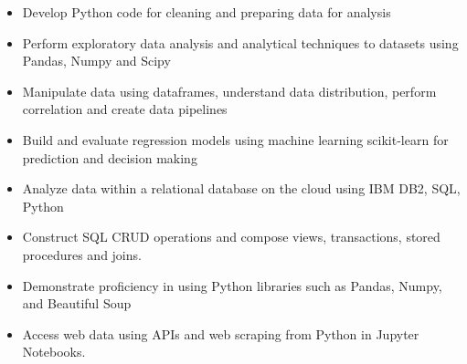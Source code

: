 \documentclass[11pt,a4paper,ragged2e]{altacv}
\begin{document}
\begin{paracol}{1}
\medskip




\begin{itemize}
\item Develop Python code for cleaning and preparing data for analysis 
\item Perform exploratory data analysis and analytical techniques to datasets using Pandas, Numpy and Scipy
\item Manipulate data using dataframes, understand data distribution, perform correlation and create data pipelines
\item Build and evaluate regression models using machine learning scikit-learn for prediction and decision making
\end{itemize}
\tightdivider

\begin{itemize}
\item Analyze data within a relational database on the cloud using IBM DB2, SQL, Python
\item Construct SQL CRUD operations and compose views, transactions, stored procedures and joins.
\end{itemize}
\tightdivider

\begin{itemize}
\item Demonstrate proficiency in using Python libraries such as Pandas, Numpy, and Beautiful Soup
\item Access web data using APIs and web scraping from Python in Jupyter Notebooks.
\end{itemize}
\tightdivider


\end{paracol}
\end{document}
